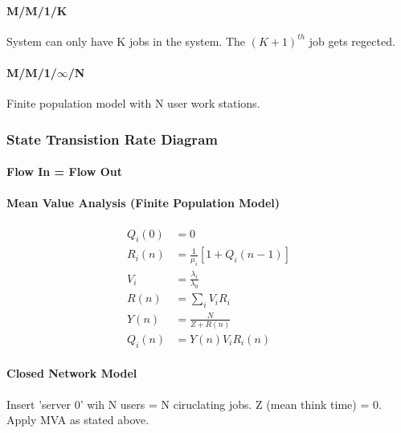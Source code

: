 \paragraph{M/M/1/K} System can only have K jobs in the system. The $(K+1)^{th}$
job gets regected.
\paragraph{M/M/1/$\infty$/N} Finite population model with N user work stations.
\subsubsection{State Transistion Rate Diagram}
\paragraph{Flow In = Flow Out}
\paragraph{Mean Value Analysis (Finite Population Model)}
\begin{align*}
	Q_i(0) &= 0 \\
	R_i(n) &= \frac{1}{\mu_i}[ 1 + Q_i(n-1) ] \\
	V_i    &= \frac{\lambda_i}{\lambda_0} \\
	R(n)   &= \sum_i V_i R_i \\
	Y(n)   &= \frac{N}{Z+R(n)} \\
	Q_i(n) &= Y(n) V_i R_i(n)
\end{align*}
\paragraph{Closed Network Model} Insert 'server 0' wih N users = N ciruclating
jobs. Z (mean think time) = 0. Apply MVA as stated above.






